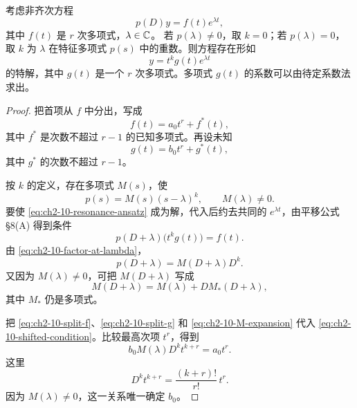 \begin{theorem}[拟多项式非齐次方程的特解形式]
\label{thm:ch2-8-quasipolynomial}
 考虑非齐次方程
 \begin{equation}
  p(D)y=f(t)e^{\lambda t},
  \label{eq:ch2-10-theorem8-equation}
 \end{equation}
 其中 \(f(t)\) 是 \(r\) 次多项式，\(\lambda\in\mathbb C\)。
 若 \(p(\lambda)\ne0\)，取 \(k=0\)；若 \(p(\lambda)=0\)，取 \(k\) 为 \(\lambda\) 在特征多项式 \(p(s)\) 中的重数。则方程存在形如
 \begin{equation}
  y=t^kg(t)e^{\lambda t}
  \label{eq:ch2-10-resonance-ansatz}
 \end{equation}
 的特解，其中 \(g(t)\) 是一个 \(r\) 次多项式。多项式 \(g(t)\) 的系数可以由待定系数法求出。
\end{theorem}

\begin{proof}
把首项从 \(f\) 中分出，写成
\begin{equation}
 f(t)=a_0t^r+f^*(t),
 \label{eq:ch2-10-split-f}
\end{equation}
其中 \(f^*\) 是次数不超过 \(r-1\) 的已知多项式。再设未知
\begin{equation}
 g(t)=b_0t^r+g^*(t),
 \label{eq:ch2-10-split-g}
\end{equation}
其中 \(g^*\) 的次数不超过 \(r-1\)。

按 \(k\) 的定义，存在多项式 \(M(s)\)，使
\begin{equation}
 p(s)=M(s)(s-\lambda)^k,
 \qquad M(\lambda)\ne0.
 \label{eq:ch2-10-factor-at-lambda}
\end{equation}
要使 \eqref{eq:ch2-10-resonance-ansatz} 成为解，代入后约去共同的 \(e^{\lambda t}\)，由平移公式 §8(A) 得到条件
\begin{equation}
 p(D+\lambda)\bigl(t^kg(t)\bigr)=f(t).
 \label{eq:ch2-10-shifted-condition}
\end{equation}
由 \eqref{eq:ch2-10-factor-at-lambda}，
\[
 p(D+\lambda)=M(D+\lambda)D^k.
\]
又因为 \(M(\lambda)\ne0\)，可把 \(M(D+\lambda)\) 写成
\begin{equation}
 M(D+\lambda)=M(\lambda)+D M_*(D+\lambda),
 \label{eq:ch2-10-M-expansion}
\end{equation}
其中 \(M_*\) 仍是多项式。

把 \eqref{eq:ch2-10-split-f}、\eqref{eq:ch2-10-split-g} 和 \eqref{eq:ch2-10-M-expansion} 代入 \eqref{eq:ch2-10-shifted-condition}。比较最高次项 \(t^r\)，得到
\begin{equation}
 b_0M(\lambda)D^k t^{k+r}=a_0t^r.
 \label{eq:ch2-10-leading-coefficient-equation}
\end{equation}
这里
\[
 D^kt^{k+r}=\frac{(k+r)!}{r!}\,t^r.
\]
因为 \(M(\lambda)\ne0\)，这一关系唯一确定 \(b_0\)。


\end{proof}
